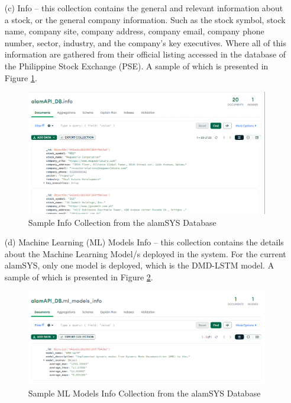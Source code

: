 \begin{itemize}
    \item[(c)] Info – this collection contains the general and relevant 
    information about a stock, or the general company information. Such as
    the stock symbol, stock name, company site, company address, company email,
    company phone number, sector, industry, and the company's key executives. Where
    all of this information are gathered from their official listing accessed in the
    database of the Philippine Stock Exchange (PSE). A sample of which is presented
    in Figure \ref{fig:odm_info_sample}.
    \begin{figure}[ht]
        \centering
        \includegraphics[width=1\textwidth]{./assets/Chapter_3/ODM/ODM_Info_Sample.png}
        \caption{Sample Info Collection from the alamSYS Database}
        \label{fig:odm_info_sample}
    \end{figure}
    \FloatBarrier

    \item[(d)] Machine Learning (ML) Models Info – this collection contains
    the details about the Machine Learning Model/s deployed in the system. For the current
    alamSYS, only one model is deployed, which is the DMD-LSTM model. A sample of which
    is presented in Figure \ref{fig:odm_ml_sample}.
    \begin{figure}[ht]
        \centering
        \includegraphics[width=1\textwidth]{./assets/Chapter_3/ODM/ODM_ML_Sample.png}
        \caption{Sample ML Models Info Collection from the alamSYS Database}
        \label{fig:odm_ml_sample}
    \end{figure}
    \FloatBarrier


\end{itemize}

